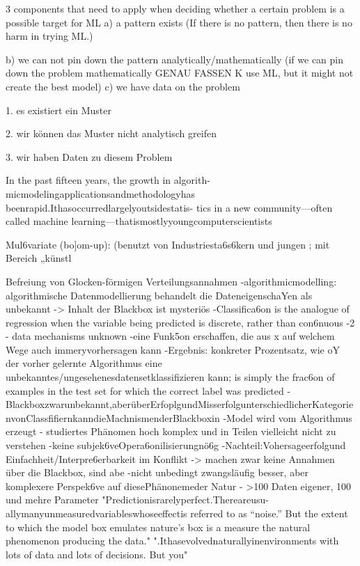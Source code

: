 \documentclass[authoryear,review,3p]{elsarticle}
\begin{document}
3 components that need to apply when deciding whether a certain problem is a possible target for ML a) a pattern exists (If there is no pattern, then there is no harm in trying ML.)

b) we can not pin down the pattern analytically/mathematically (if we can pin down the problem mathematically GENAU FASSEN K use ML, but it might not create the best model)
c) we have data on the problem



1. es existiert ein Muster

2. wir können das Muster nicht analytisch greifen

3. wir haben Daten zu diesem Problem




In the past fifteen years, the growth in algorith- micmodelingapplicationsandmethodologyhas beenrapid.Ithasoccurredlargelyoutsidestatis- tics in a new community—often called machine learning—thatismostlyyoungcomputerscientists

Mul6variate (bo]om-up): (benutzt von Industriesta6s6kern und jungen ; mit Bereich „künstl

Befreiung von Glocken-förmigen Verteilungsannahmen
-algorithmicmodelling: algorithmische Datenmodellierung behandelt die DateneigenschaYen als unbekannt -> Inhalt der Blackbox ist mysteriös
-Classifica6on is the analogue of regression when the variable being predicted is discrete, rather than con6nuous
-2%
- data mechanisms unknown
-eine Funk5on erschaffen, die aus x auf welchem Wege auch immeryvorhersagen kann
-Ergebnis: konkreter Prozentsatz, wie oY der vorher gelernte Algorithmus eine unbekanntes/ungesehenesdatensetklassifizieren kann; is simply the frac6on of examples in the test set for which the correct label was predicted -Blackboxzwarunbekannt,aberüberErfoplgundMisserfolgunterschiedlicherKategorienvonClassfifiernkanndieMachnismenderBlackboxin -Model wird vom Algorithmus erzeugt
- studiertes Phänomen hoch komplex und in Teilen vielleicht nicht zu verstehen
-keine subjek6veOpera6onilisierungnö6g
-Nachteil:Vohersageerfolgund Einfachheit/Interpre6erbarkeit im Konflikt -> machen zwar keine Annahmen über die Blackbox, sind abe -nicht unbedingt zwangsläufig besser, aber komplexere Perspek6ve auf diesePhänonemeder Natur
- >100 Daten eigener, 100 und mehre Parameter
"Predictionisrarelyperfect.Thereareusu- allymanyunmeasuredvariableswhoseeffectis referred to as “noise.” But the extent to which the model box emulates nature’s box is a measure the natural phenomenon producing the data."
".Ithasevolvednaturallyinenvironments with lots of data and lots of decisions. But you"
\end{document}
